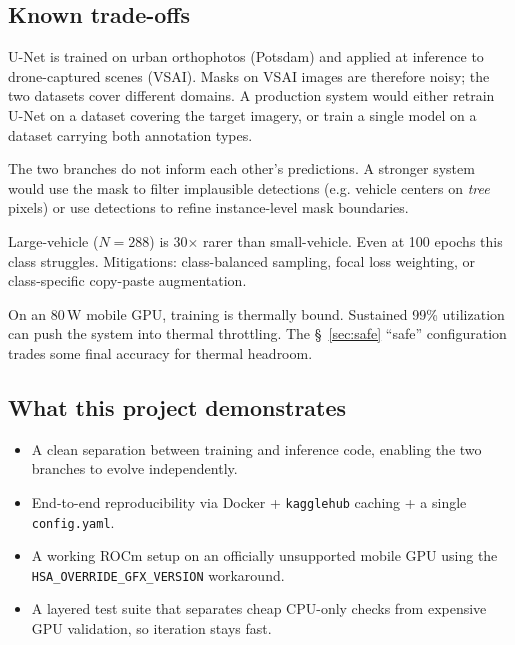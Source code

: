 \documentclass[11pt,a4paper]{article}
\begin{document}
\subsection{Known trade-offs}

\begin{description}[leftmargin=1.2em, style=nextline]
  \item[Cross-domain generalization] U-Net is trained on urban orthophotos (Potsdam)
    and applied at inference to drone-captured scenes (VSAI). Masks on VSAI images
    are therefore noisy; the two datasets cover different domains. A production
    system would either retrain U-Net on a dataset covering the target imagery,
    or train a single model on a dataset carrying both annotation types.
  \item[Fusion is not cross-modal] The two branches do not inform each other's
    predictions. A stronger system would use the mask to filter implausible
    detections (e.g. vehicle centers on \emph{tree} pixels) or use detections to
    refine instance-level mask boundaries.
  \item[Class imbalance in VSAI] Large-vehicle ($N=288$) is 30$\times$ rarer than
    small-vehicle. Even at 100 epochs this class struggles. Mitigations:
    class-balanced sampling, focal loss weighting, or class-specific
    copy-paste augmentation.
  \item[Hardware constraints] On an 80\,W mobile GPU, training is
    thermally bound. Sustained 99\% utilization can push the system into
    thermal throttling. The \S~\ref{sec:safe} ``safe'' configuration trades
    some final accuracy for thermal headroom.
\end{description}

\subsection{What this project demonstrates}

\begin{itemize}[leftmargin=*, itemsep=3pt]
  \item A clean separation between training and inference code, enabling the two
    branches to evolve independently.
  \item End-to-end reproducibility via Docker + \texttt{kagglehub} caching + a
    single \texttt{config.yaml}.
  \item A working ROCm setup on an officially unsupported mobile GPU using
    the \texttt{HSA\_OVERRIDE\_GFX\_VERSION} workaround.
  \item A layered test suite that separates cheap CPU-only checks from expensive
    GPU validation, so iteration stays fast.
\end{itemize}
\end{document}
